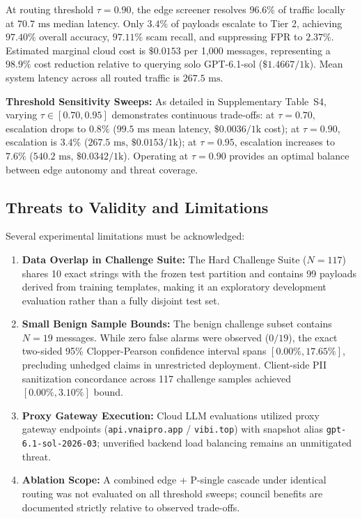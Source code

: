 \documentclass[journal]{IEEEtran}
\begin{document}
At routing threshold $\tau = 0.90$, the edge screener resolves $96.6\%$ of traffic locally at $70.7\text{ ms}$ median latency. Only $3.4\%$ of payloads escalate to Tier 2, achieving $97.40\%$ overall accuracy, $97.11\%$ scam recall, and suppressing FPR to $2.37\%$. Estimated marginal cloud cost is $\$0.0153$ per 1,000 messages, representing a $98.9\%$ cost reduction relative to querying solo GPT-6.1-sol ($\$1.4667/1\text{k}$). Mean system latency across all routed traffic is $267.5\text{ ms}$.

\textbf{Threshold Sensitivity Sweeps:} As detailed in Supplementary Table~S4, varying $\tau \in [0.70, 0.95]$ demonstrates continuous trade-offs: at $\tau = 0.70$, escalation drops to $0.8\%$ ($99.5\text{ ms}$ mean latency, $\$0.0036/1\text{k}$ cost); at $\tau = 0.90$, escalation is $3.4\%$ ($267.5\text{ ms}$, $\$0.0153/1\text{k}$); at $\tau = 0.95$, escalation increases to $7.6\%$ ($540.2\text{ ms}$, $\$0.0342/1\text{k}$). Operating at $\tau = 0.90$ provides an optimal balance between edge autonomy and threat coverage.

\subsection{Threats to Validity and Limitations}
\label{subsec:threats}

Several experimental limitations must be acknowledged:
\begin{enumerate}
    \item \textbf{Data Overlap in Challenge Suite:} The Hard Challenge Suite ($N=117$) shares 10 exact strings with the frozen test partition and contains 99 payloads derived from training templates, making it an exploratory development evaluation rather than a fully disjoint test set.
    \item \textbf{Small Benign Sample Bounds:} The benign challenge subset contains $N=19$ messages. While zero false alarms were observed ($0/19$), the exact two-sided 95\% Clopper-Pearson confidence interval spans $[0.00\%, 17.65\%]$, precluding unhedged claims in unrestricted deployment. Client-side PII sanitization concordance across 117 challenge samples achieved $[0.00\%, 3.10\%]$ bound.
    \item \textbf{Proxy Gateway Execution:} Cloud LLM evaluations utilized proxy gateway endpoints (\texttt{api.vnaipro.app} / \texttt{vibi.top}) with snapshot alias \texttt{gpt-6.1-sol-2026-03}; unverified backend load balancing remains an unmitigated threat.
    \item \textbf{Ablation Scope:} A combined edge + P-single cascade under identical routing was not evaluated on all threshold sweeps; council benefits are documented strictly relative to observed trade-offs.
\end{enumerate}
\end{document}
